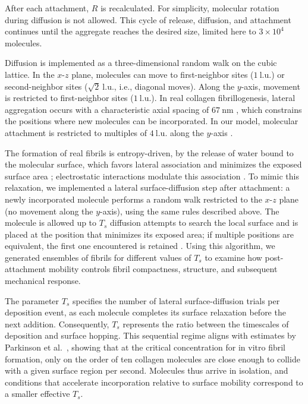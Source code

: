 \documentclass[aps,physrev,preprint,groupedaddress,linenumbers]{revtex4-2}
\begin{document}
After each attachment, $R$ is recalculated. For simplicity, molecular rotation during diffusion is not allowed. This cycle of release, diffusion, and attachment continues until the aggregate reaches the desired size, limited here to $3\times 10^4$ molecules.

Diffusion is implemented as a three-dimensional random walk on the cubic lattice. In the $x$-$z$ plane, molecules can move to first-neighbor sites ($1~\text{l.u.}$) or second-neighbor sites ($\sqrt{2}~\text{l.u.}$, i.e., diagonal moves). Along the $y$-axis, movement is restricted to first-neighbor sites ($1~\text{l.u.}$). In real collagen fibrillogenesis, lateral aggregation occurs with a characteristic axial spacing of $67~\text{nm}$ \cite{Kadler1996}, which constrains the positions where new molecules can be incorporated. In our model, molecular attachment is restricted to multiples of $4~\text{l.u.}$ along the $y$-axis \cite{Parkinson1995}.

The formation of real fibrils is entropy-driven, by the release of water bound to the molecular surface, which favors lateral association and minimizes the exposed surface area \cite{Kadler1987,Parkinson1995}; electrostatic interactions modulate this association \cite{Jiang2004,Morozova2018}. To mimic this relaxation, we implemented a lateral surface-diffusion step after attachment: a newly incorporated molecule performs a random walk restricted to the $x$-$z$ plane (no movement along the $y$-axis), using the same rules described above. The molecule is allowed up to $T_s$ diffusion attempts to search the local surface and is placed at the position that minimizes its exposed area; if multiple positions are equivalent, the first one encountered is retained \cite{Garci1991}. Using this algorithm, we generated ensembles of fibrils for different values of $T_s$ to examine how post-attachment mobility controls fibril compactness, structure, and subsequent mechanical response.

The parameter $T_s$ specifies the number of lateral surface-diffusion trials per deposition event, as each molecule completes its surface relaxation before the next addition. Consequently, $T_s$ represents the ratio between the timescales of deposition and surface hopping. This sequential regime aligns with estimates by Parkinson et al.~\cite{Parkinson1995}, showing that at the critical concentration for in vitro fibril formation, only on the order of ten collagen molecules are close enough to collide with a given surface region per second. Molecules thus arrive in isolation, and conditions that accelerate incorporation relative to surface mobility correspond to a smaller effective $T_s$.
\end{document}
